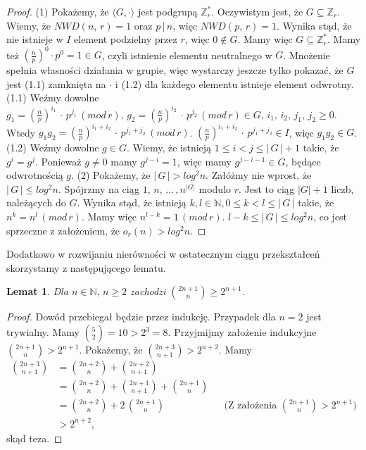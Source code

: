 \documentclass[declaration,shortabstract]{iithesis}
\theoremstyle{definition}
\theoremstyle{remark} \newtheorem{observation}{Obserwacja}
\theoremstyle{plain} \newtheorem{theorem}{Twierdzenie}
\theoremstyle{plain} \newtheorem{lemma}{Lemat}
\theoremstyle{remark} \newtheorem*{remark*}{Uwaga}
\theoremstyle{reminder} \newtheorem*{reminder*}{Przypomnienie}
\begin{document}
\begin{proof}
	(1) Pokażemy, że $\langle G, \cdot \rangle$ jest podgrupą $\mathbb{Z}_r^*$. Oczywistym jest, że $G \subseteq \mathbb{Z}_r$. Wiemy, że $NWD(n, \, r) = 1$ oraz $p \, | \, n$, więc $NWD(p, \, r) = 1$. Wynika stąd, że nie istnieje w $I$ element podzielny przez $r$, więc $0 \notin G$. Mamy więc $G \subseteq \mathbb{Z}_r^*$. Mamy też $(\frac{n}{p})^0\cdot p^0 = 1 \in G$, czyli istnienie elementu neutralnego w $G$. Mnożenie spełnia własności działania w grupie, więc wystarczy jeszcze tylko pokazać, że $G$ jest (1.1) zamknięta na $\cdot$ i (1.2) dla każdego elementu istnieje element odwrotny.\newline
	(1.1) Weźmy dowolne $g_1 = (\frac{n}{p})^{i_1} \, \cdot \, p^{j_1} \, (mod\,r), \, g_2 = (\frac{n}{p})^{i_2} \, \cdot \, p^{j_2}  \, (mod\,r) \in G, \, i_1, \,i_2, \,j_1, \, j_2 \geq 0$. Wtedy $g_1g_2 = (\frac{n}{p})^{i_1 + i_2} \, \cdot \, p^{j_1 + j_2} \, (mod\,r)$. $(\frac{n}{p})^{i_1 + i_2} \, \cdot \, p^{j_1 + j_2} \in I$, więc $g_1g_2\in G$. \newline
	(1.2) Weźmy dowolne $g \in G$. Wiemy, że istnieją $1 \leq i < j \leq | \, G \, | + 1$ takie, że $g^i = g^j$. Ponieważ $g \neq 0$ mamy $g^{j - i} = 1$, więc mamy $g^{j - i - 1} \in G$, będące odwrotnością $g$. \newline
	(2) Pokażemy, że $|\,G\,| > log^2n$. Załóżmy nie wprost, że $|\,G\,| \leq log^2n$. Spójrzmy na ciąg $1,\, n, \, \dots\,, n^{|G|}$ modulo $r$. Jest to ciąg $|G| + 1$ liczb, należących do $G$. Wynika stąd, że istnieją $k, l \in \mathbb{N}, 0 \leq k < l \leq |\,G\,|$ takie, że $n^k = n^l \, (mod\,r)$. Mamy więc $n^{l-k} = 1 \, (mod\,r)$. $l - k \leq |\,G\,| \leq log^2n$, co jest sprzeczne z założeniem, że $o_r(n) > log^2n$. 
\end{proof}

Dodatkowo w rozwijaniu nierówności w ostatecznym ciągu przekształceń skorzystamy z następującego lematu.

\begin{lemma}\label{newton1}
	Dla $n \in \mathbb{N}, \, n \geq 2$ zachodzi ${2n + 1 \choose n} \geq 2^{n+1}$.
\end{lemma}
	
\begin{proof}
	Dowód przebiegał będzie przez indukcję. Przypadek dla $n = 2$ jest trywialny. Mamy ${5 \choose 2} = 10 > 2^3 = 8.$\newline
	Przyjmijmy założenie indukcyjne ${2n + 1 \choose n} > 2^{n+1}$. Pokażemy, że ${2n + 3 \choose n + 1} > 2^{n+2}$. Mamy
	\begin{align*}
		{2n + 3 \choose n + 1} &= {2n + 2 \choose n} + {2n + 2 \choose n + 1} \\
		&= {2n + 2 \choose n} + {2n + 1 \choose n + 1} + {2n + 1 \choose n} \\
		  & = {2n + 2 \choose n} + 2\, {2n + 1 \choose n} &   & \text{(Z założenia ${2n + 1 \choose n} > 2^{n+1}$)} \\
		&> 2^{n+2},
	\end{align*}
	skąd teza.
\end{proof}
	
\end{document}
